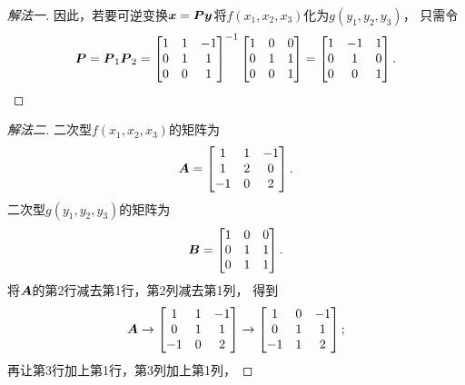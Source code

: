 \begin{example}
\begin{solution}
\begin{proof}[解法一]
因此，若要可逆变换\(\boldsymbol{x} = \boldsymbol{P} \boldsymbol{y}\)将\(f(x_1,x_2,x_3)\)化为\(g(y_1,y_2,y_3)\)，
只需令\begin{equation*}
	\boldsymbol{P} = \boldsymbol{P}_1 \boldsymbol{P}_2
	= \begin{bmatrix}
		1 & 1 & -1 \\
		0 & 1 & 1 \\
		0 & 0 & 1
	\end{bmatrix}^{-1}
	\begin{bmatrix}
		1 & 0 & 0 \\
		0 & 1 & 1 \\
		0 & 0 & 1
	\end{bmatrix}
	= \begin{bmatrix}
		1 & -1 & 1 \\
		0 & 1 & 0 \\
		0 & 0 & 1
	\end{bmatrix}.
\end{equation*}
\end{proof}
\begin{proof}[解法二]
二次型\(f(x_1,x_2,x_3)\)的矩阵为\begin{equation*}
	\boldsymbol{A} = \begin{bmatrix}
		1 & 1 & -1 \\
		1 & 2 & 0 \\
		-1 & 0 & 2
	\end{bmatrix}.
\end{equation*}
二次型\(g(y_1,y_2,y_3)\)的矩阵为\begin{equation*}
	\boldsymbol{B} = \begin{bmatrix}
		1 & 0 & 0 \\
		0 & 1 & 1 \\
		0 & 1 & 1
	\end{bmatrix}.
\end{equation*}
将\(\boldsymbol{A}\)的第2行减去第1行，第2列减去第1列，
得到\begin{equation*}
	\boldsymbol{A} \to \begin{bmatrix}
		1 & 1 & -1 \\
		0 & 1 & 1 \\
		-1 & 0 & 2
	\end{bmatrix}
	\to \begin{bmatrix}
		1 & 0 & -1 \\
		0 & 1 & 1 \\
		-1 & 1 & 2
	\end{bmatrix};
\end{equation*}
再让第3行加上第1行，第3列加上第1列，

\end{proof}
\end{solution}
\end{example}
